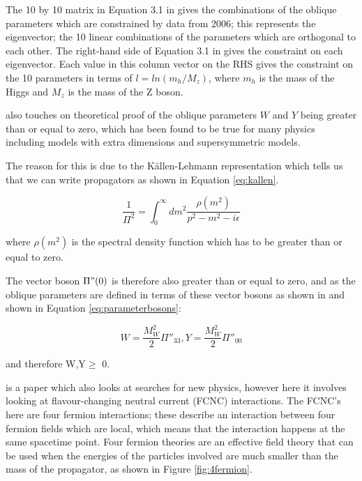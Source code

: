 \documentclass[11pt,oneside,a4paper]{article}
\begin{document}
The 10 by 10 matrix in Equation 3.1 in \cite{EWprecision} gives the combinations of the oblique parameters which are constrained by data from 2006; this represents the eigenvector; the 10 linear combinations of the parameters which are orthogonal to each other. The right-hand side of Equation 3.1 in \cite{EWprecision} gives the constraint on each eigenvector. Each value in this column vector on the RHS gives the constraint on the 10 parameters in terms of $l = ln(m_{h}/M_{z})$, where $m_{h}$ is the mass of the Higgs and $M_{z}$ is the mass of the Z boson.

\cite{EWprecision} also touches on theoretical proof of the oblique parameters $W$ and $Y$ being greater than or equal to zero, which has been found to be true for many physics including models with extra dimensions \cite{dimmensions} and supersymmetric models. 

The reason for this is due to the K\"allen-Lehmann representation which tells us that we can write propagators as shown in Equation \ref{eq:kallen}.

\begin{equation}
\label{eq:kallen}
\frac{1}{\Pi^{2}} = \int_{0}^{\infty} dm^{2} \frac{\rho(m^2)}{p^{2} - m^{2} - i\epsilon}
\end{equation}

where $\rho(m^2)$ is the spectral density function which has to be greater than or equal to zero.

The vector boson $\Pi"(0)$ is therefore also greater than or equal to zero, and as the oblique parameters are defined in terms of these vector bosons as shown in \cite{EWprecision} and shown in Equation \ref{eq:parameterbosons}:

\begin{equation}
\label{eq:parameterbosons}
W = \frac{M^{2}_{W}}{2}\Pi''_{33} , Y=\frac{M^{2}_{W}}{2}\Pi''_{00}
\end{equation}

and therefore W,Y$\geq$ 0. 

\cite{highptdilepton} is a paper which also looks at searches for new physics, however here it involves looking at flavour-changing neutral current (FCNC) interactions. The FCNC's here are four fermion interactions; these describe an interaction between four fermion fields which are local, which means that the interaction happens at the same spacetime point. Four fermion theories are an effective field theory that can be used when the energies of the particles involved are much smaller than the mass of the propagator, as shown in Figure \ref{fig:4fermion}.
\end{document}
